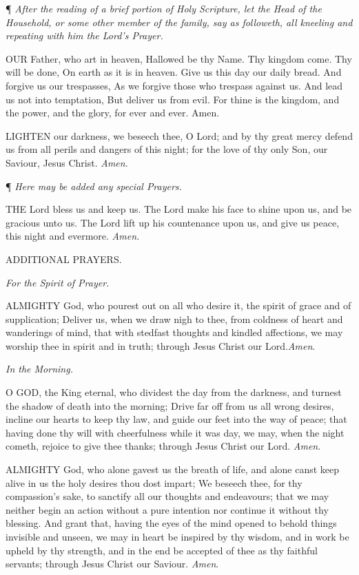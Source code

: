 ¶
\emph{After the reading of a brief portion of Holy Scripture, let the Head
of the Household, or some other member of the family, say as followeth,
all kneeling and repeating with him the Lord's Prayer.}

OUR
Father, who art in heaven, Hallowed be thy Name. Thy kingdom come. Thy
will be done, On earth as it is in heaven. Give us this day our daily
bread. And forgive us our trespasses, As we forgive those who trespass
against us. And lead us not into temptation, But deliver us from evil.
For thine is the kingdom, and the power, and the glory, for ever and ever.
Amen.

LIGHTEN
our darkness, we beseech thee, O Lord; and by thy great mercy defend us
from all perils and dangers of this night; for the love of thy only Son,
our Saviour, Jesus Christ. \emph{Amen}.

¶
\emph{Here may be added any special Prayers.}

THE
Lord bless us and keep us. The Lord make his face to shine upon us, and
be gracious unto us. The Lord lift up his countenance upon us, and give
us peace, this night and evermore. \emph{Amen.}

ADDITIONAL
PRAYERS.

\emph{For
the Spirit of Prayer.}

ALMIGHTY
God, who pourest out on all who desire it, the spirit of grace and of
supplication; Deliver us, when we draw nigh to thee, from coldness of
heart and wanderings of mind, that with stedfast thoughts and kindled
affections, we may worship thee in spirit and in truth; through Jesus
Christ our Lord.\emph{Amen}.

\emph{In
the Morning.}

O
GOD, the King eternal, who dividest the day from the darkness, and turnest
the shadow of death into the morning; Drive far off from us all wrong
desires, incline our hearts to keep thy law, and guide our feet into the
way of peace; that having done thy will with cheerfulness while it was
day, we may, when the night cometh, rejoice to give thee thanks; through
Jesus Christ our Lord. \emph{Amen}.

ALMIGHTY
God, who alone gavest us the breath of life, and alone canst keep alive
in us the holy desires thou dost impart; We beseech thee, for thy compassion's
sake, to sanctify all our thoughts and endeavours; that we may neither
begin an action without a pure intention nor continue it without thy blessing.
And grant that, having the eyes of the mind opened to behold things invisible
and unseen, we may in heart be inspired by thy wisdom, and in work be
upheld by thy strength, and in the end be accepted of thee as thy faithful
servants; through Jesus Christ our Saviour. \emph{Amen}.

